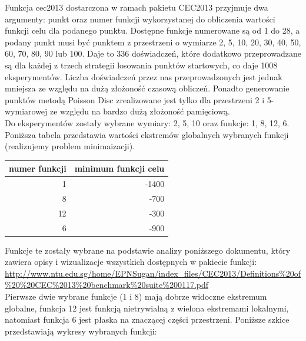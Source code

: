 \documentclass{article}
\begin{document}
Funkcja cec2013 dostarczona w ramach pakietu CEC2013 przyjmuje dwa argumenty: punkt oraz numer funkcji wykorzystanej do obliczenia wartości funkcji celu dla podanego punktu. Dostępne funkcje numerowane są od 1 do 28, a podany punkt musi być punktem z przestrzeni o wymiarze 2, 5, 10, 20, 30, 40, 50, 60, 70, 80, 90 lub 100. Daje to 336 doświadczeń, które dodatkowo przeprowadzane są dla każdej z trzech strategii losowania punktów startowych, co daje 1008 eksperymentów. Liczba doświadczeń przez nas przeprowadzonych jest jednak mniejsza ze względu na dużą złożoność czasową obliczeń. Ponadto generowanie punktów metodą Poisson Disc zrealizowane jest tylko dla przestrzeni 2 i 5-wymiarowej ze względu na bardzo dużą złożoność pamięciową.\\
Do eksperymentów zostały wybrane wymiary: 2, 5, 10 oraz funkcje: 1, 8, 12, 6. Poniższa tabela przedstawia wartości ekstremów globalnych wybranych funkcji (realizujemy problem minimaizacji).\\
\begin{center}
\begin{tabular}{|r|r|}
  \hline 
  numer funkcji & minimum funkcji celu\\
  \hline 
  1 & -1400\\
  \hline
  8 & -700 \\
  \hline
  12 & -300 \\
  \hline
  6 & -900 \\
  \hline
\end{tabular}
\end{center}
Funkcje te zostały wybrane na podstawie analizy poniższego dokumentu, który zawiera opisy i wizualizacje wszystkich dostępnych w pakiecie funkcji:\\
\url{http://www.ntu.edu.sg/home/EPNSugan/index_files/CEC2013/Definitions%20of%20%20CEC%2013%20benchmark%20suite%200117.pdf} \\
Pierwsze dwie wybrane funkcje (1 i 8) mają dobrze widoczne ekstremum globalne, funkcja 12 jest funkcją nietrywialną z wielona ekstremami lokalnymi, natomiast funkcja 6 jest płaska na znaczącej części przestrzeni.
\newpage
Poniższe szkice przedstawiają wykresy wybranych funkcji:\\
\end{document}
